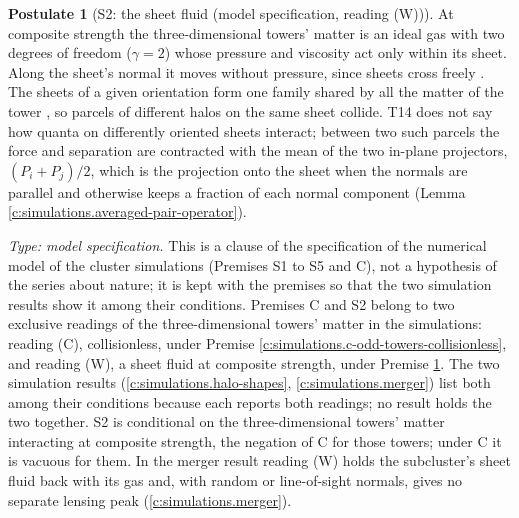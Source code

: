 \documentclass[11pt]{article}
\theoremstyle{definition}
\newtheorem{postulate}[theorem]{Postulate}
\theoremstyle{plain}
\newcommand{\changedmark}[2]{\marginpar{\raggedright\scriptsize\color{#1}#2}}
\begin{document}
\begin{postulate}[S2: the sheet fluid (model specification, reading (W))]\label{c:simulations.s2-sheet-fluid}
\changedmark{BurntOrange}{changed since the deposit}
At composite strength the three-dimensional towers' matter is an ideal gas with two degrees of freedom ($\gamma = 2$) whose pressure and viscosity act only within its sheet. Along the sheet's normal it moves without pressure, since sheets cross freely \cite[Rem.~7.30]{ButlerT14}. The sheets of a given orientation form one family shared by all the matter of the tower \cite[Lem.~6.1, Prem.~7.4]{ButlerT14}, so parcels of different halos on the same sheet collide. T14 does not say how quanta on differently oriented sheets interact; between two such parcels the force and separation are contracted with the mean of the two in-plane projectors, $(P_{i} + P_{j})/2$, which is the projection onto the sheet when the normals are parallel and otherwise keeps a fraction of each normal component (Lemma \ref{c:simulations.averaged-pair-operator}).

\emph{Type: model specification.} This is a clause of the specification of the numerical model of the cluster simulations (Premises S1 to S5 and C), not a hypothesis of the series about nature; it is kept with the premises so that the two simulation results show it among their conditions. Premises C and S2 belong to two exclusive readings of the three-dimensional towers' matter in the simulations: reading (C), collisionless, under Premise \ref{c:simulations.c-odd-towers-collisionless}, and reading (W), a sheet fluid at composite strength, under Premise \ref{c:simulations.s2-sheet-fluid}. The two simulation results (\ref{c:simulations.halo-shapes}, \ref{c:simulations.merger}) list both among their conditions because each reports both readings; no result holds the two together. S2 is conditional on the three-dimensional towers' matter interacting at composite strength, the negation of C for those towers; under C it is vacuous for them. In the merger result reading (W) holds the subcluster's sheet fluid back with its gas and, with random or line-of-sight normals, gives no separate lensing peak (\ref{c:simulations.merger}).
\end{postulate}
\end{document}
